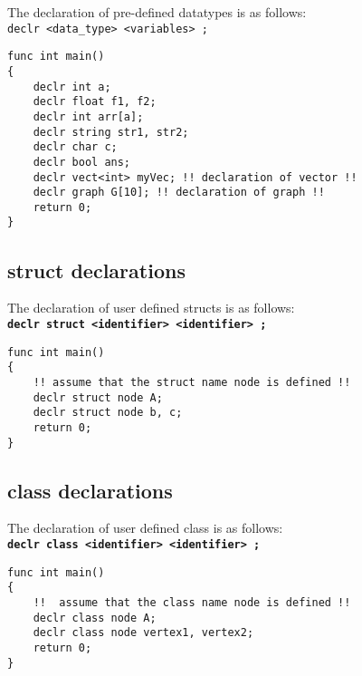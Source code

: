 \documentclass[journal, 18pt]{report}
\begin{document}
The declaration of pre-defined datatypes is as follows:\\
\texttt{declr <data\_type> <variables> ;}


\begin{lstlisting}
func int main()
{
    declr int a;
    declr float f1, f2;
    declr int arr[a];
    declr string str1, str2;
    declr char c;
    declr bool ans; 
    declr vect<int> myVec; !! declaration of vector !!
    declr graph G[10]; !! declaration of graph !!
    return 0;
}
\end{lstlisting}

\subsection{struct declarations}
The declaration of user defined structs is as follows:\\
\textbf{\texttt{declr struct <identifier> <identifier> ;}}
\begin{lstlisting}
func int main()
{
    !! assume that the struct name node is defined !!
    declr struct node A;
    declr struct node b, c;
    return 0;
}
\end{lstlisting}

\subsection{class declarations}
The declaration of user defined class is as follows:\\
\textbf{\texttt{declr class <identifier> <identifier> ;}}
\begin{lstlisting}
func int main()
{
    !!  assume that the class name node is defined !!
    declr class node A;
    declr class node vertex1, vertex2;
    return 0;
}
\end{lstlisting}
\end{document}
